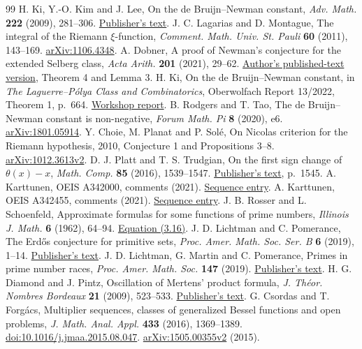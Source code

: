 \documentclass[11pt,a4paper]{article}
\begin{document}
\begin{thebibliography}{99}\small
{} H. Ki, Y.-O. Kim and J. Lee, On the de Bruijn--Newman
constant, \emph{Adv. Math.} \textbf{222} (2009), 281--306.
\href{https://doi.org/10.1016/j.aim.2009.04.003}{Publisher's text}.
 J. C. Lagarias and D. Montague, The integral of the Riemann
$\xi$-function, \emph{Comment. Math. Univ. St. Pauli} \textbf{60} (2011),
143--169. \href{https://arxiv.org/abs/1106.4348}{arXiv:1106.4348}.
 A. Dobner, A proof of Newman's conjecture for the extended
Selberg class, \emph{Acta Arith.} \textbf{201} (2021), 29--62.
\href{https://arxiv.org/abs/2005.05142v2}{Author's published-text version}, Theorem 4 and Lemma 3.
 H. Ki, On the de Bruijn--Newman constant, in
\emph{The Laguerre--P\'olya Class and Combinatorics}, Oberwolfach Report
13/2022, Theorem 1, p.~664.
\href{https://ems.press/content/serial-article-files/46952}{Workshop report}.
 B. Rodgers and T. Tao, The de Bruijn--Newman constant is
non-negative, \emph{Forum Math. Pi} \textbf{8} (2020), e6.
\href{https://arxiv.org/abs/1801.05914}{arXiv:1801.05914}.
 Y. Choie, M. Planat and P. Sol\'e, On Nicolas criterion
for the Riemann hypothesis, 2010, Conjecture 1 and Propositions 3--8.
\href{https://arxiv.org/abs/1012.3613}{arXiv:1012.3613v2}.
 D. J. Platt and T. S. Trudgian, On the first sign change
of $\theta(x)-x$, \emph{Math. Comp.} \textbf{85} (2016), 1539--1547.
\href{https://doi.org/10.1090/mcom/3021}{Publisher's text}, p.~1545.
 A. Karttunen, OEIS A342000, comments (2021).
\href{https://oeis.org/A342000}{Sequence entry}.
 A. Karttunen, OEIS A342455, comments (2021).
\href{https://oeis.org/A342455}{Sequence entry}.
 J. B. Rosser and L. Schoenfeld, Approximate formulas for
some functions of prime numbers, \emph{Illinois J. Math.} \textbf{6}
(1962), 64--94. \href{https://doi.org/10.1215/ijm/1255631807}{Equation (3.16)}.
 J. D. Lichtman and C. Pomerance, The Erd\H{o}s conjecture
for primitive sets, \emph{Proc. Amer. Math. Soc. Ser. B} \textbf{6}
(2019), 1--14. \href{https://doi.org/10.1090/bproc/40}{Publisher's text}.
 J. D. Lichtman, G. Martin and C. Pomerance, Primes in prime
number races, \emph{Proc. Amer. Math. Soc.} \textbf{147} (2019).
\href{https://doi.org/10.1090/proc/14569}{Publisher's text}.
 H. G. Diamond and J. Pintz, Oscillation of Mertens'
product formula, \emph{J. Th\'eor. Nombres Bordeaux} \textbf{21}
(2009), 523--533. \href{https://doi.org/10.5802/jtnb.687}{Publisher's text}.
G. Csordas and T. Forg\'acs,
Multiplier sequences, classes of generalized Bessel functions and open
problems, \emph{J. Math. Anal. Appl.} \textbf{433} (2016), 1369--1389.
\href{https://doi.org/10.1016/j.jmaa.2015.08.047}{doi:10.1016/j.jmaa.2015.08.047}.
\href{https://arxiv.org/pdf/1505.00355v2}{arXiv:1505.00355v2} (2015).


\end{thebibliography}
\end{document}
